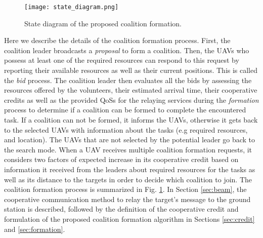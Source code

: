 \documentclass[conference]{IEEEtran}
\theoremstyle{remark}
\theoremstyle{lemma}
\begin{document}
\begin{figure}[b]
  \centering
  \centerline{\texttt{[image: state\_diagram.png]}}
\caption{State diagram of the proposed coalition formation.}
\label{fig:statediagram}
\end{figure}
Here we describe the details of the coalition formation process. First, the coalition leader broadcasts a \emph{proposal} to form a coalition. Then, the UAVs who possess at least one of the required resources can respond to this request by reporting their available resources as well as their current positions. This is called the \emph{bid} process. The coalition leader then evaluates all the bids by assessing the resources offered by the volunteers, their estimated arrival time, their cooperative credits as well as the provided QoSs for the relaying services during the \emph{formation} process to determine if a coalition can be formed to complete the encountered task. If a coalition can not be formed, it informs the UAVs, otherwise it gets back to the selected UAVs with information about the tasks (e.g required resources, and location). The UAVs that are not selected by the potential leader go back to the search mode. When a UAV receives multiple coalition formation requests, it considers two factors of expected increase in its cooperative credit based on information it received from the leaders about required resources for the tasks as well as its distance to the targets in order to decide which coalition to join. The coalition formation process is summarized in Fig. \ref{fig:statediagram}. In Section \ref{sec:beam}, the cooperative communication method to relay the target's message to the ground station is described, followed by the definition of the cooperative credit and formulation of the proposed coalition formation algorithm in Sections \ref{sec:credit} and \ref{sec:formation}.


\end{document}
